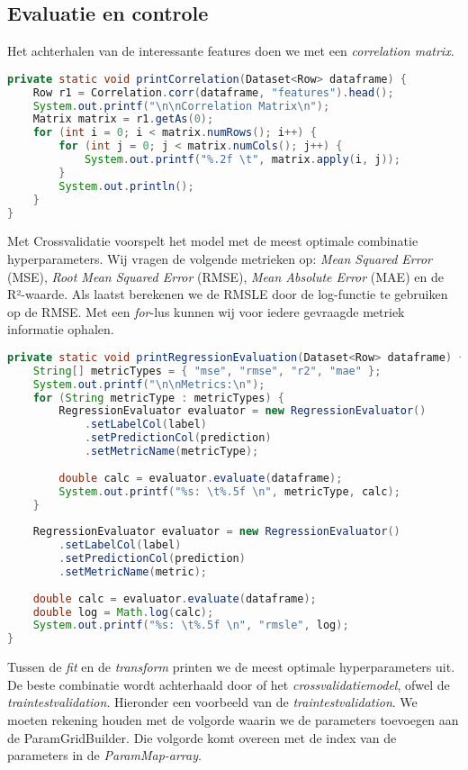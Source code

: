 \documentclass[a4paper,10pt,twoside]{report}
\begin{document}
\newpage

\subsection*{Evaluatie en controle}

Het achterhalen van de interessante features doen we met een \textit{correlation matrix}.

\begin{lstlisting}[language=Java]
private static void printCorrelation(Dataset<Row> dataframe) {
	Row r1 = Correlation.corr(dataframe, "features").head();
	System.out.printf("\n\nCorrelation Matrix\n");
	Matrix matrix = r1.getAs(0);
	for (int i = 0; i < matrix.numRows(); i++) {
		for (int j = 0; j < matrix.numCols(); j++) {
			System.out.printf("%.2f \t", matrix.apply(i, j));
		}
		System.out.println();
	}
}
\end{lstlisting}

Met Crossvalidatie voorspelt het model met de meest optimale combinatie hyperparameters. Wij vragen de volgende metrieken op: \textit{Mean Squared Error} (MSE), \textit{Root Mean Squared Error} (RMSE), \textit{Mean Absolute Error} (MAE) en de R²-waarde. Als laatst berekenen we de RMSLE door de log-functie te gebruiken op de RMSE. Met een \textit{for}-lus kunnen wij voor iedere gevraagde metriek informatie ophalen.

\begin{lstlisting}[language=Java]
private static void printRegressionEvaluation(Dataset<Row> dataframe) {
	String[] metricTypes = { "mse", "rmse", "r2", "mae" };
	System.out.printf("\n\nMetrics:\n");
	for (String metricType : metricTypes) {
		RegressionEvaluator evaluator = new RegressionEvaluator()
			.setLabelCol(label)
			.setPredictionCol(prediction)
			.setMetricName(metricType);
		
		double calc = evaluator.evaluate(dataframe);
		System.out.printf("%s: \t%.5f \n", metricType, calc);
	}
	
	RegressionEvaluator evaluator = new RegressionEvaluator()
		.setLabelCol(label)
		.setPredictionCol(prediction)
		.setMetricName(metric);
	
	double calc = evaluator.evaluate(dataframe);
	double log = Math.log(calc);
	System.out.printf("%s: \t%.5f \n", "rmsle", log);
}
\end{lstlisting}

Tussen de \textit{fit} en de \textit{transform} printen we de meest optimale hyperparameters uit. De beste combinatie wordt achterhaald door of het \textit{crossvalidatiemodel}, ofwel de \textit{traintestvalidation}. Hieronder een voorbeeld van de \textit{traintestvalidation}. We moeten rekening houden met de volgorde waarin we de parameters toevoegen aan de ParamGridBuilder. Die volgorde komt overeen met de index van de parameters in de \textit{ParamMap-array}.
\end{document}
